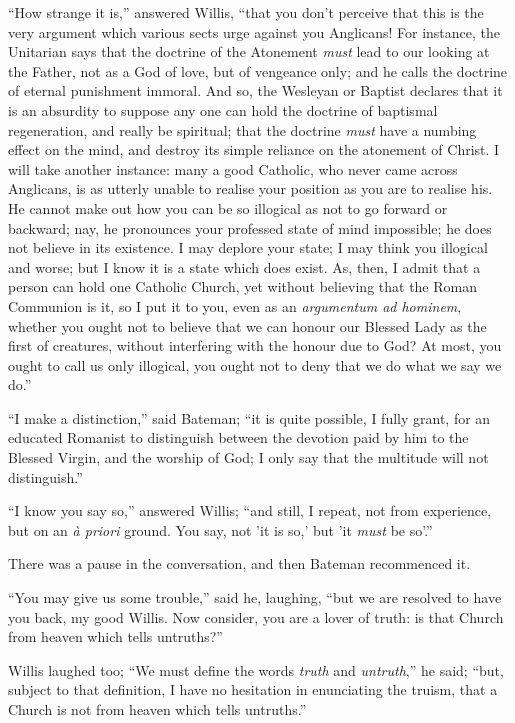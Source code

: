 ``How strange it is,'' answered Willis, ``that you don't
perceive that this is the very argument which various sects urge
against you Anglicans! For instance, the Unitarian says that the
doctrine of the Atonement \emph{must} lead to our looking at the
Father, not as a God of love, but of vengeance only; and he calls the
doctrine of eternal punishment immoral. And so, the Wesleyan or
Baptist declares that it is an absurdity to suppose any one can
hold the doctrine of baptismal regeneration, and really be spiritual;
that the doctrine \emph{must} have a numbing effect on the mind, and
destroy its simple reliance on the atonement of Christ. I will take
another instance: many a good Catholic, who never came across
Anglicans, is as utterly unable to realise your position as you are to
realise his. He cannot make out how you can be so illogical as not to
go forward or backward; nay, he pronounces your professed state of
mind impossible; he does not believe in its existence. I may deplore
your state; I may think you illogical and worse; but I know it is a
state which does exist. As, then, I admit that a person can hold one
Catholic Church, yet without believing that the Roman Communion is it,
so I put it to you, even as an \emph{argumentum ad hominem}, whether
you ought not to believe that we can honour our Blessed Lady as the
first of creatures, without interfering with the honour due to God? At
most, you ought to call us only illogical, you ought not to deny that
we do what we say we do.''

``I make a distinction,'' said Bateman; ``it is quite
possible, I fully grant, for an educated Romanist to distinguish
between the devotion paid by him to the Blessed Virgin, and the
worship of God; I only say that the multitude will not
distinguish.''

``I know you say so,'' answered Willis; ``and still, I
repeat, not from experience, but on an \emph{à priori} ground. You
say, not 'it is so,' but 'it \emph{must} be so'.''

There was a pause in the conversation, and then Bateman recommenced
it.

``You may give us some trouble,'' said he, laughing,
``but we are resolved to have you back, my good Willis. Now
consider, you are a lover of truth: is that Church from heaven which
tells untruths?''

Willis laughed too; ``We must define the words \emph{truth} and
\emph{untruth},'' he said; ``but, subject to that definition,
I have no hesitation in enunciating the truism, that a Church is not
from heaven which tells untruths.''


